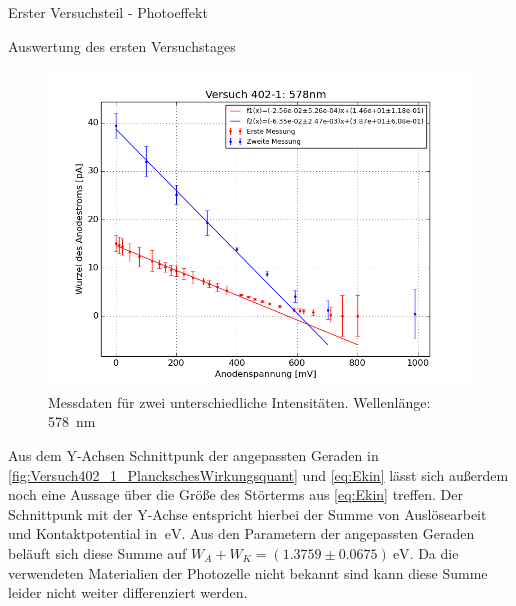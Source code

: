 \documentclass[pdftex, a4paper,11pt, twoside, ngerman]{report}
\begin{document}
\begin{chapter}{Erster Versuchsteil - Photoeffekt}
\begin{section}{Auswertung des ersten Versuchstages}
\begin{figure}[htbp]
\begin{minipage}{0.48\textwidth}
          \centering
          \includegraphics[width=\textwidth]{Figures/Versuch402_1_578.png}
          \caption{Messdaten für zwei unterschiedliche Intensitäten.
              Wellenlänge: \SI{578}{\nano\meter}}
          \label{fig:Versuch402_1_578}
        \end{minipage}
      \end{figure}
      
      Aus dem Y-Achsen Schnittpunk der angepassten Geraden in 
      \cref{fig:Versuch402_1_PlanckschesWirkungsquant} und \cref{eq:Ekin} 
      lässt sich außerdem noch eine Aussage über die Größe des Störterms aus 
      \cref{eq:Ekin} treffen. Der Schnittpunk mit der Y-Achse entspricht 
      hierbei der Summe von Auslösearbeit und Kontaktpotential in 
      $\SI{}{\electronvolt}$. Aus den Parametern der angepassten Geraden 
      beläuft sich diese Summe auf 
      $W_{A}+W_{K}=(1.3759\pm0.0675)\SI{}{\electronvolt}$. Da die verwendeten 
      Materialien der Photozelle nicht bekannt sind kann diese Summe leider 
      nicht weiter differenziert werden.
      

\end{section}
\end{chapter}
\end{document}
